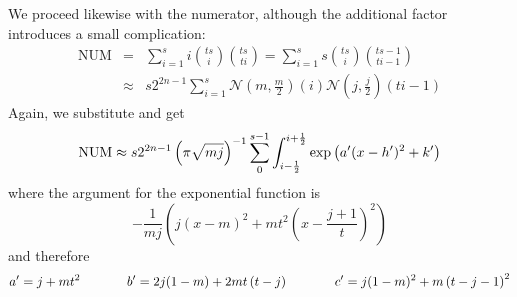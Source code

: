\documentclass[12pt]{article}
\begin{document}
We proceed likewise with the numerator, although the additional factor
introduces a small complication:
  \begin{eqnarray*}
  \mbox{NUM}&=&\sum_{i=1}^{s}i\binom{ts}{i}\binom{ts}{ti}=\sum_{i=1}^{s}s\binom{ts}{i}\binom{ts-1}{ti-1}\\
&\approx&s2^{2n-1}\sum_{i=1}^{s}\mathcal{N}\left(m,\frac{m}{2}\right)(i)\mathcal{N}\left(j,\frac{j}{2}\right)(ti-1)
\end{eqnarray*}
Again, we substitute and get
\begin{displaymath}
  \mbox{NUM}\approx{}s2^{2n-1}\left(\pi\sqrt{mj}\right)^{-1}\sum_{0}^{s-1}\int_{i-\frac{1}{2}}^{i+\frac{1}{2}}\exp\left({a'}(x-{h'})^{2}+{k'}\right)
\end{displaymath}
where the argument for the exponential function is
\begin{displaymath}
  -\frac{1}{mj}\left(j(x-m)^{2}+mt^{2}\left(x-\frac{j+1}{t}\right)^{2}\right)
\end{displaymath}
and therefore
\begin{displaymath}
{a'}=j+mt^{2}\hspace{.5in}
{b'}=2j(1-m)+2mt\left(t-j\right)\hspace{.5in}
{c'}=j(1-m)^{2}+m\left(t-j-1\right)^{2}
\end{displaymath}
\end{document}
